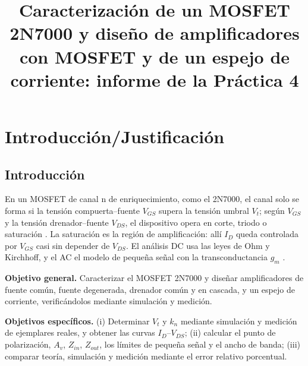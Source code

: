 \documentclass[conference]{IEEEtran}
\newcommand{\gm}{g_m}
\newcommand{\kn}{k_n}
\begin{document}
\title{Caracterización de un MOSFET 2N7000 y diseño de amplificadores con MOSFET y de un espejo de corriente: informe de la Práctica 4}

\author{
}

\maketitle

\section{Introducción/Justificación}

\subsection{Introducción}
En un MOSFET de canal n de enriquecimiento, como el 2N7000, el canal solo se forma si la tensión compuerta--fuente $V_{GS}$ supera la tensión umbral $V_t$; según $V_{GS}$ y la tensión drenador--fuente $V_{DS}$, el dispositivo opera en corte, triodo o saturación \cite{sedra}. La saturación es la región de amplificación: allí $I_D$ queda controlada por $V_{GS}$ casi sin depender de $V_{DS}$. El análisis DC usa las leyes de Ohm y Kirchhoff, y el AC el modelo de pequeña señal con la transconductancia $\gm$ \cite{sedra}.

\textbf{Objetivo general.} Caracterizar el MOSFET 2N7000 y diseñar amplificadores de fuente común, fuente degenerada, drenador común y en cascada, y un espejo de corriente, verificándolos mediante simulación y medición.

\textbf{Objetivos específicos.} (i) Determinar $V_t$ y $\kn$ mediante simulación y medición de ejemplares reales, y obtener las curvas $I_D$--$V_{DS}$; (ii) calcular el punto de polarización, $A_v$, $Z_{in}$, $Z_{out}$, los límites de pequeña señal y el ancho de banda; (iii) comparar teoría, simulación y medición mediante el error relativo porcentual.
\end{document}

